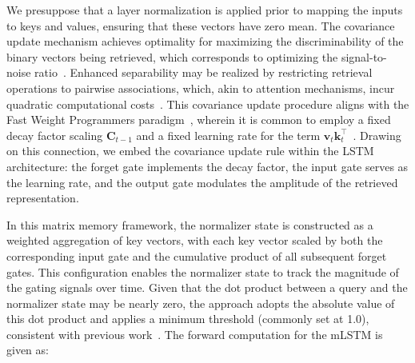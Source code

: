 We presuppose that a layer normalization is applied prior to mapping the inputs to keys and values, ensuring that these vectors have zero mean. The covariance update mechanism achieves optimality for maximizing the discriminability of the binary vectors being retrieved, which corresponds to optimizing the signal-to-noise ratio~\citep{Dayan:91}. Enhanced separability may be realized by restricting retrieval operations to pairwise associations, which, akin to attention mechanisms, incur quadratic computational costs~\citep{Krotov:16,Krotov:17,Ramsauer:21}. This covariance update procedure aligns with the Fast Weight Programmers paradigm~\citep{Schmidhuber:92ncfastweights,Schlag:21}, wherein it is common to employ a fixed decay factor scaling $\mathbf{C}_{t-1}$ and a fixed learning rate for the term $\mathbf{v}_{t} \mathbf{k}_t ^\top$~\citep{Ba:16}. Drawing on this connection, we embed the covariance update rule within the LSTM architecture: the forget gate implements the decay factor, the input gate serves as the learning rate, and the output gate modulates the amplitude of the retrieved representation.

In this matrix memory framework, the normalizer state is constructed as a weighted aggregation of key vectors, with each key vector scaled by both the corresponding input gate and the cumulative product of all subsequent forget gates. This configuration enables the normalizer state to track the magnitude of the gating signals over time. Given that the dot product between a query and the normalizer state may be nearly zero, the approach adopts the absolute value of this dot product and applies a minimum threshold (commonly set at 1.0), consistent with previous work~\citep{Sun:23arxiv}. The forward computation for the mLSTM is given as:

